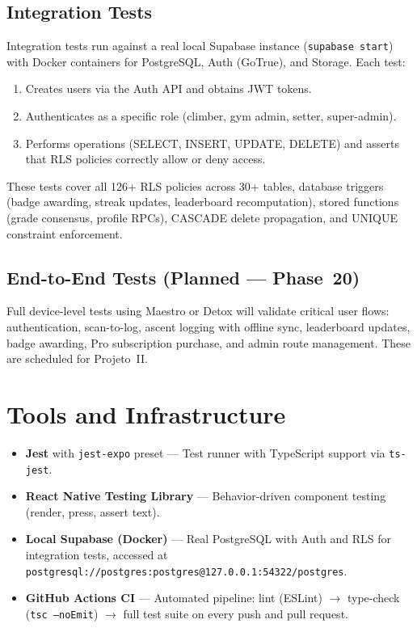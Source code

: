 \documentclass[12pt,a4paper]{report}
\renewcommand\_{\textunderscore\hspace{0pt}}
\begin{document}
\subsection{Integration Tests}

Integration tests run against a real local Supabase instance (\texttt{supabase start}) with Docker containers for PostgreSQL, Auth (GoTrue), and Storage. Each test:

\begin{enumerate}[noitemsep]
    \item Creates users via the Auth API and obtains JWT tokens.
    \item Authenticates as a specific role (climber, gym admin, setter, super-admin).
    \item Performs operations (SELECT, INSERT, UPDATE, DELETE) and asserts that RLS policies correctly allow or deny access.
\end{enumerate}

These tests cover all 126+ RLS policies across 30+ tables, database triggers (badge awarding, streak updates, leaderboard recomputation), stored functions (grade consensus, profile RPCs), CASCADE delete propagation, and UNIQUE constraint enforcement.

\subsection{End-to-End Tests (Planned --- Phase~20)}

Full device-level tests using Maestro or Detox will validate critical user flows: authentication, scan-to-log, ascent logging with offline sync, leaderboard updates, badge awarding, Pro subscription purchase, and admin route management. These are scheduled for Projeto~II.

\section{Tools and Infrastructure}

\begin{itemize}[noitemsep]
    \item \textbf{Jest} \cite{JeDo25} with \texttt{jest-expo} preset --- Test runner with TypeScript support via \texttt{ts-jest}.
    \item \textbf{React Native Testing Library} --- Behavior-driven component testing (render, press, assert text).
    \item \textbf{Local Supabase (Docker)} --- Real PostgreSQL with Auth and RLS for integration tests, accessed at \texttt{postgresql://postgres:postgres@127.0.0.1:54322/postgres}.
    \item \textbf{GitHub Actions CI} --- Automated pipeline: lint (ESLint) $\rightarrow$ type-check (\texttt{tsc --noEmit}) $\rightarrow$ full test suite on every push and pull request.
\end{itemize}
\end{document}
